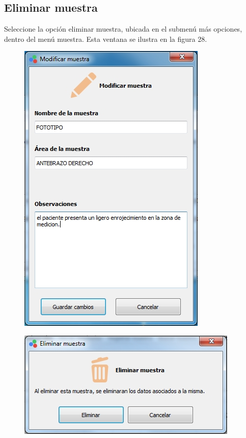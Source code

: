 	\subsection{Eliminar muestra}
	
	Seleccione la opci\'{o}n eliminar muestra, ubicada en el submen\'{u} m\'{a}s opciones, dentro del men\'{u} muestra. Esta ventana se ilustra en la figura 28.
	
\begin{figure}[H]
\centering
\begin{minipage}{.5\textwidth}
  \centering
  \includegraphics[width=.9\linewidth]{./img/modificar-muestra.jpg}
  \label{fig:test1}
\end{minipage}%
\begin{minipage}{.5\textwidth}
  \centering
  \includegraphics[width=1\linewidth]{./img/eliminar-muestra.jpg}

\end{minipage}
\end{figure}
